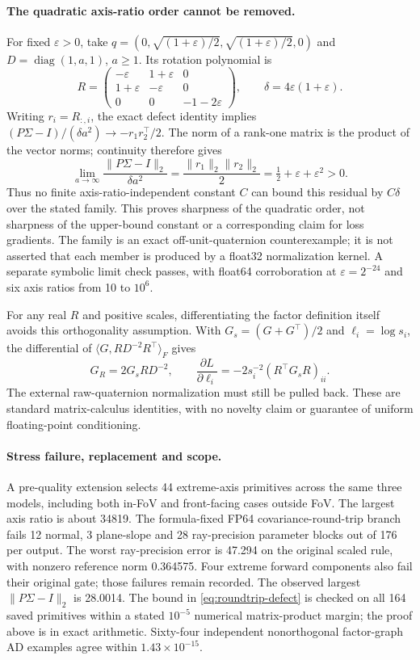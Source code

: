 \documentclass[11pt,a4paper]{article}
\begin{document}
\paragraph{The quadratic axis-ratio order cannot be removed.}
For fixed $\varepsilon>0$, take
$q=(0,\sqrt{(1+\varepsilon)/2},\sqrt{(1+\varepsilon)/2},0)$ and
$D=\operatorname{diag}(1,a,1)$, $a\ge1$. Its rotation polynomial is
\[
 R=\begin{pmatrix}
 -\varepsilon&1+\varepsilon&0\\
 1+\varepsilon&-\varepsilon&0\\
 0&0&-1-2\varepsilon
 \end{pmatrix},\qquad \delta=4\varepsilon(1+\varepsilon).
\]
Writing $r_i=R_{:,i}$, the exact defect identity implies
$(P\Sigma-I)/(\delta a^2)\to-r_1r_2^\top/2$.
The norm of a rank-one matrix is the product of the vector norms;
continuity therefore gives
\[
 \lim_{a\to\infty}\frac{\|P\Sigma-I\|_2}{\delta a^2}
 =\frac{\|r_1\|_2\|r_2\|_2}{2}
 =\tfrac12+\varepsilon+\varepsilon^2>0.
\]
Thus no finite axis-ratio-independent constant $C$ can bound this
residual by $C\delta$ over the stated family. This proves sharpness
of the quadratic order, not sharpness of the upper-bound constant
or a corresponding claim for loss gradients. The family is an exact
off-unit-quaternion counterexample; it is not asserted that each
member is produced by a float32 normalization kernel. A separate
symbolic limit check passes, with float64 corroboration at
$\varepsilon=2^{-24}$ and six axis ratios from 10 to $10^6$.

For any real $R$ and positive scales, differentiating the factor
definition itself avoids this orthogonality assumption. With
$G_s=(G+G^\top)/2$ and $\ell_i=\log s_i$, the differential of
$\langle G,RD^{-2}R^\top\rangle_F$ gives
\[
 G_R=2G_sRD^{-2},\qquad
 \frac{\partial L}{\partial\ell_i}
 =-2s_i^{-2}(R^\top G_sR)_{ii}.
\]
The external raw-quaternion normalization must still be pulled back.
These are standard matrix-calculus identities, with no novelty claim
or guarantee of uniform floating-point conditioning.

\paragraph{Stress failure, replacement and scope.}
A pre-quality extension selects 44 extreme-axis primitives across
the same three models, including both in-FoV and front-facing cases
outside FoV. The largest axis ratio is about 34819. The formula-fixed
FP64 covariance-round-trip branch fails 12 normal, 3 plane-slope and
28 ray-precision parameter blocks out of 176 per output. The worst
ray-precision error is 47.294 on the original scaled rule, with
nonzero reference norm 0.364575. Four extreme forward components
also fail their original gate; those failures remain recorded.
The observed largest $\|P\Sigma-I\|_2$ is 28.0014. The bound in
\eqref{eq:roundtrip-defect} is checked on all 164 saved primitives
within a stated $10^{-5}$ numerical matrix-product margin; the proof
above is in exact arithmetic. Sixty-four independent nonorthogonal
factor-graph AD examples agree within $1.43\times10^{-15}$.
\end{document}
